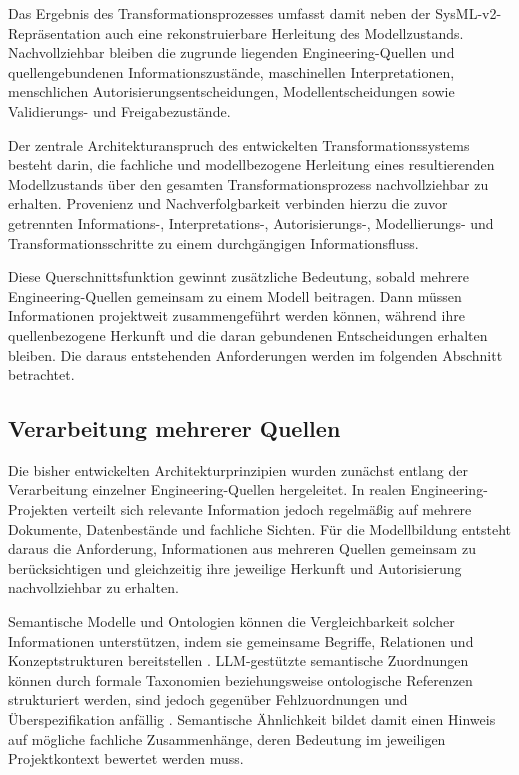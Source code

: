 Das Ergebnis des Transformationsprozesses umfasst damit neben der
SysML-v2-Repräsentation auch eine rekonstruierbare Herleitung des
Modellzustands. Nachvollziehbar bleiben die zugrunde liegenden
Engineering-Quellen und quellengebundenen Informationszustände, maschinellen
Interpretationen, menschlichen Autorisierungsentscheidungen,
Modellentscheidungen sowie Validierungs- und Freigabezustände.

Der zentrale Architekturanspruch des entwickelten Transformationssystems
besteht darin, die fachliche und modellbezogene Herleitung eines
resultierenden Modellzustands über den gesamten Transformationsprozess
nachvollziehbar zu erhalten. Provenienz und Nachverfolgbarkeit verbinden
hierzu die zuvor getrennten Informations-, Interpretations-,
Autorisierungs-, Modellierungs- und Transformationsschritte zu einem
durchgängigen Informationsfluss.

Diese Querschnittsfunktion gewinnt zusätzliche Bedeutung, sobald mehrere
Engineering-Quellen gemeinsam zu einem Modell beitragen. Dann müssen
Informationen projektweit zusammengeführt werden können, während ihre
quellenbezogene Herkunft und die daran gebundenen Entscheidungen erhalten
bleiben. Die daraus entstehenden Anforderungen werden im folgenden Abschnitt
betrachtet.

\subsection{Verarbeitung mehrerer Quellen}
\label{sec:architecture_multisource}

Die bisher entwickelten Architekturprinzipien wurden zunächst entlang der
Verarbeitung einzelner Engineering-Quellen hergeleitet. In realen
Engineering-Projekten verteilt sich relevante Information jedoch regelmäßig
auf mehrere Dokumente, Datenbestände und fachliche Sichten. Für die
Modellbildung entsteht daraus die Anforderung, Informationen aus mehreren
Quellen gemeinsam zu berücksichtigen und gleichzeitig ihre jeweilige
Herkunft und Autorisierung nachvollziehbar zu erhalten.

Semantische Modelle und Ontologien können die Vergleichbarkeit solcher
Informationen unterstützen, indem sie gemeinsame Begriffe, Relationen und
Konzeptstrukturen bereitstellen
\cite{OrellanaMandrick2019,Lu2022,Dong2026}. LLM-gestützte semantische
Zuordnungen können durch formale Taxonomien beziehungsweise ontologische
Referenzen strukturiert werden, sind jedoch gegenüber Fehlzuordnungen und
Überspezifikation anfällig \cite{Souza.2026}. Semantische Ähnlichkeit bildet
damit einen Hinweis auf mögliche fachliche Zusammenhänge, deren Bedeutung
im jeweiligen Projektkontext bewertet werden muss.


